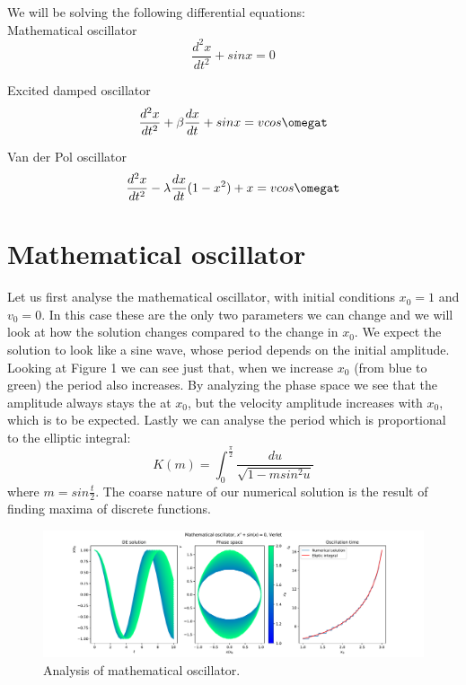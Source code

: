 \documentclass[12pt, a4paper]{article}
\begin{document}
We will be solving the following differential equations:\\

Mathematical oscillator
\begin{equation*}
  \frac{d^2x}{dt^2} + sinx = 0
\end{equation*}

Excited damped oscillator
\begin{equation*}
  \frac{d^2x}{dt^2} + \beta \frac{dx}{dt} + sinx = vcos\omegat
\end{equation*}

Van der Pol oscillator
\begin{equation*}
  \frac{d^2x}{dt^2} - \lambda \frac{dx}{dt} (1-x^2) + x = vcos\omegat
\end{equation*}

\section{Mathematical oscillator}

Let us first analyse the mathematical oscillator, with initial conditions $x_0 = 1$ and $v_0 = 0$. In this case these are the only two parameters we can change and we will look at how the solution changes compared to the change in $x_0$. We expect the solution to look like a sine wave, whose period depends on the initial amplitude. Looking at Figure 1 we can see just that, when we increase $x_0$ (from blue to green) the period also increases. By analyzing the phase space we see that the amplitude always stays the at $x_0$, but the velocity amplitude increases with $x_0$, which is to be expected. Lastly we can analyse the period which is proportional to the elliptic integral:
\begin{equation*}
  K(m) = \int^{\frac{\pi}{2}}_{0}\frac{du}{\sqrt{1-msin^2u}}
\end{equation*}
where $m = sin\frac{t}{2}$. The coarse nature of our numerical solution is the result of finding maxima of discrete functions.

\begin{figure}[hbtp]
  \begin{center}
  \includegraphics[width=15cm]{graphs/method_analysis.pdf}
  \end{center}
  \vspace*{-7mm}
  \caption{Analysis of mathematical oscillator.}
\end{figure}
\end{document}
